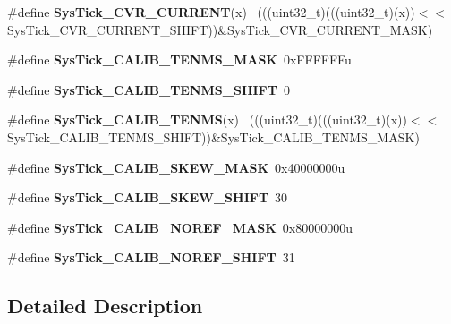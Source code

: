 \begin{DoxyCompactItemize}
\item 
\hypertarget{group___sys_tick___register___masks_ga97b2a7bb2c882eb623545fdad8b93316}{}\#define {\bfseries Sys\+Tick\+\_\+\+C\+V\+R\+\_\+\+C\+U\+R\+R\+E\+N\+T}(x)                                  ~(((uint32\+\_\+t)(((uint32\+\_\+t)(x))$<$$<$Sys\+Tick\+\_\+\+C\+V\+R\+\_\+\+C\+U\+R\+R\+E\+N\+T\+\_\+\+S\+H\+I\+F\+T))\&Sys\+Tick\+\_\+\+C\+V\+R\+\_\+\+C\+U\+R\+R\+E\+N\+T\+\_\+\+M\+A\+S\+K)\label{group___sys_tick___register___masks_ga97b2a7bb2c882eb623545fdad8b93316}

\item 
\hypertarget{group___sys_tick___register___masks_gac7496217678b52cce71dd785ed2b779b}{}\#define {\bfseries Sys\+Tick\+\_\+\+C\+A\+L\+I\+B\+\_\+\+T\+E\+N\+M\+S\+\_\+\+M\+A\+S\+K}~0x\+F\+F\+F\+F\+F\+Fu\label{group___sys_tick___register___masks_gac7496217678b52cce71dd785ed2b779b}

\item 
\hypertarget{group___sys_tick___register___masks_gad2786b21e30185770874c88e29f22047}{}\#define {\bfseries Sys\+Tick\+\_\+\+C\+A\+L\+I\+B\+\_\+\+T\+E\+N\+M\+S\+\_\+\+S\+H\+I\+F\+T}~0\label{group___sys_tick___register___masks_gad2786b21e30185770874c88e29f22047}

\item 
\hypertarget{group___sys_tick___register___masks_ga67fd5343d7d5e3040a03a9d2a0cb4f33}{}\#define {\bfseries Sys\+Tick\+\_\+\+C\+A\+L\+I\+B\+\_\+\+T\+E\+N\+M\+S}(x)                                  ~(((uint32\+\_\+t)(((uint32\+\_\+t)(x))$<$$<$Sys\+Tick\+\_\+\+C\+A\+L\+I\+B\+\_\+\+T\+E\+N\+M\+S\+\_\+\+S\+H\+I\+F\+T))\&Sys\+Tick\+\_\+\+C\+A\+L\+I\+B\+\_\+\+T\+E\+N\+M\+S\+\_\+\+M\+A\+S\+K)\label{group___sys_tick___register___masks_ga67fd5343d7d5e3040a03a9d2a0cb4f33}

\item 
\hypertarget{group___sys_tick___register___masks_gaade570cf5b9c0a8da6e1215de8db8d82}{}\#define {\bfseries Sys\+Tick\+\_\+\+C\+A\+L\+I\+B\+\_\+\+S\+K\+E\+W\+\_\+\+M\+A\+S\+K}~0x40000000u\label{group___sys_tick___register___masks_gaade570cf5b9c0a8da6e1215de8db8d82}

\item 
\hypertarget{group___sys_tick___register___masks_ga12bc3aae96690bf88f38e0bf46aa3d8b}{}\#define {\bfseries Sys\+Tick\+\_\+\+C\+A\+L\+I\+B\+\_\+\+S\+K\+E\+W\+\_\+\+S\+H\+I\+F\+T}~30\label{group___sys_tick___register___masks_ga12bc3aae96690bf88f38e0bf46aa3d8b}

\item 
\hypertarget{group___sys_tick___register___masks_gabca0ac6719f78220d81d2fc1328d5a45}{}\#define {\bfseries Sys\+Tick\+\_\+\+C\+A\+L\+I\+B\+\_\+\+N\+O\+R\+E\+F\+\_\+\+M\+A\+S\+K}~0x80000000u\label{group___sys_tick___register___masks_gabca0ac6719f78220d81d2fc1328d5a45}

\item 
\hypertarget{group___sys_tick___register___masks_ga957057ddf04b20227820b1343b08a302}{}\#define {\bfseries Sys\+Tick\+\_\+\+C\+A\+L\+I\+B\+\_\+\+N\+O\+R\+E\+F\+\_\+\+S\+H\+I\+F\+T}~31\label{group___sys_tick___register___masks_ga957057ddf04b20227820b1343b08a302}

\end{DoxyCompactItemize}


\subsection{Detailed Description}
